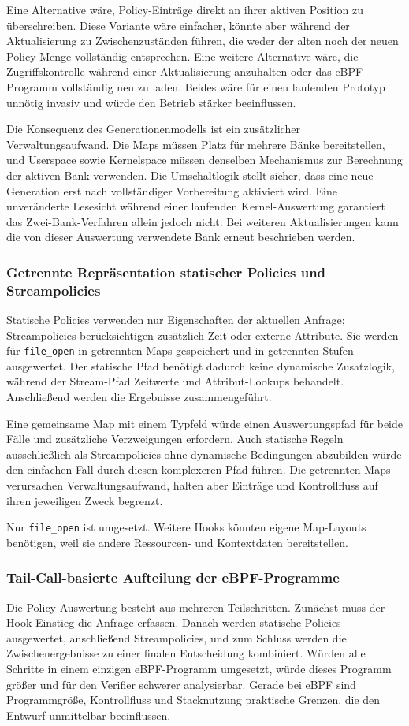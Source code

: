 Eine Alternative wäre, Policy-Einträge direkt an ihrer aktiven Position zu überschreiben.
Diese Variante wäre einfacher, könnte aber während der Aktualisierung zu Zwischenzuständen führen, die weder der alten noch der neuen Policy-Menge vollständig entsprechen.
Eine weitere Alternative wäre, die Zugriffskontrolle während einer Aktualisierung anzuhalten oder das eBPF-Programm vollständig neu zu laden.
Beides wäre für einen laufenden Prototyp unnötig invasiv und würde den Betrieb stärker beeinflussen.

Die Konsequenz des Generationenmodells ist ein zusätzlicher Verwaltungsaufwand.
Die Maps müssen Platz für mehrere Bänke bereitstellen, und Userspace sowie Kernelspace müssen denselben Mechanismus zur Berechnung der aktiven Bank verwenden.
Die Umschaltlogik stellt sicher, dass eine neue Generation erst nach vollständiger Vorbereitung aktiviert wird.
Eine unveränderte Lesesicht während einer laufenden Kernel-Auswertung garantiert das Zwei-Bank-Verfahren allein jedoch nicht: Bei weiteren Aktualisierungen kann die von dieser Auswertung verwendete Bank erneut beschrieben werden.

\subsubsection{Getrennte Repräsentation statischer Policies und Streampolicies}
Statische Policies verwenden nur Eigenschaften der aktuellen Anfrage; Streampolicies berücksichtigen zusätzlich Zeit oder externe Attribute. Sie werden für \texttt{file\_open} in getrennten Maps gespeichert und in getrennten Stufen ausgewertet. Der statische Pfad benötigt dadurch keine dynamische Zusatzlogik, während der Stream-Pfad Zeitwerte und Attribut-Lookups behandelt. Anschließend werden die Ergebnisse zusammengeführt.

Eine gemeinsame Map mit einem Typfeld würde einen Auswertungspfad für beide Fälle und zusätzliche Verzweigungen erfordern. Auch statische Regeln ausschließlich als Streampolicies ohne dynamische Bedingungen abzubilden würde den einfachen Fall durch diesen komplexeren Pfad führen. Die getrennten Maps verursachen Verwaltungsaufwand, halten aber Einträge und Kontrollfluss auf ihren jeweiligen Zweck begrenzt.

Nur \texttt{file\_open} ist umgesetzt. Weitere Hooks könnten eigene Map-Layouts benötigen, weil sie andere Ressourcen- und Kontextdaten bereitstellen.

\subsubsection{Tail-Call-basierte Aufteilung der eBPF-Programme}
Die Policy-Auswertung besteht aus mehreren Teilschritten.
Zunächst muss der Hook-Einstieg die Anfrage erfassen.
Danach werden statische Policies ausgewertet, anschließend Streampolicies, und zum Schluss werden die Zwischenergebnisse zu einer finalen Entscheidung kombiniert.
Würden alle Schritte in einem einzigen eBPF-Programm umgesetzt, würde dieses Programm größer und für den Verifier schwerer analysierbar.
Gerade bei eBPF sind Programmgröße, Kontrollfluss und Stacknutzung praktische Grenzen, die den Entwurf unmittelbar beeinflussen.


